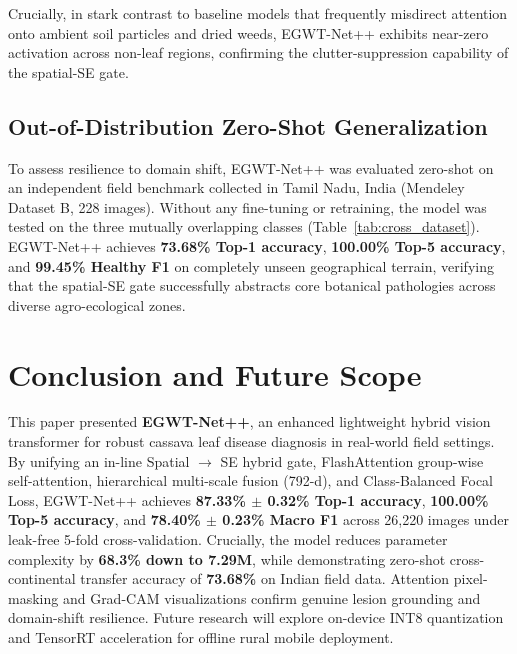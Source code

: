 \documentclass[conference]{IEEEtran}
\let\origsection\section
\renewcommand{\section}{\needspace{6\baselineskip}\origsection}
\let\origsubsection\subsection
\renewcommand{\subsection}{\needspace{5\baselineskip}\origsubsection}
\begin{document}
Crucially, in stark contrast to baseline models that frequently misdirect attention onto ambient soil particles and dried weeds, EGWT-Net++ exhibits near-zero activation across non-leaf regions, confirming the clutter-suppression capability of the spatial-SE gate.

\subsection{Out-of-Distribution Zero-Shot Generalization}
To assess resilience to domain shift, EGWT-Net++ was evaluated zero-shot on an independent field benchmark collected in Tamil Nadu, India (Mendeley Dataset B, 228 images). Without any fine-tuning or retraining, the model was tested on the three mutually overlapping classes (Table~\ref{tab:cross_dataset}).
EGWT-Net++ achieves \textbf{73.68\% Top-1 accuracy}, \textbf{100.00\% Top-5 accuracy}, and \textbf{99.45\% Healthy F1} on completely unseen geographical terrain, verifying that the spatial-SE gate successfully abstracts core botanical pathologies across diverse agro-ecological zones.

\section{Conclusion and Future Scope}
This paper presented \textbf{EGWT-Net++}, an enhanced lightweight hybrid vision transformer for robust cassava leaf disease diagnosis in real-world field settings. By unifying an in-line Spatial $\rightarrow$ SE hybrid gate, FlashAttention group-wise self-attention, hierarchical multi-scale fusion (792-d), and Class-Balanced Focal Loss, EGWT-Net++ achieves \textbf{87.33\% $\pm$ 0.32\% Top-1 accuracy}, \textbf{100.00\% Top-5 accuracy}, and \textbf{78.40\% $\pm$ 0.23\% Macro F1} across 26,220 images under leak-free 5-fold cross-validation. Crucially, the model reduces parameter complexity by \textbf{68.3\% down to 7.29M}, while demonstrating zero-shot cross-continental transfer accuracy of \textbf{73.68\%} on Indian field data. Attention pixel-masking and Grad-CAM visualizations confirm genuine lesion grounding and domain-shift resilience. Future research will explore on-device INT8 quantization and TensorRT acceleration for offline rural mobile deployment.
\end{document}
